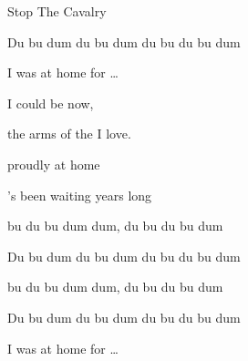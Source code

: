 \begin{SBSong}{Stop The Cavalry}
\begin{SBVerse}
    Du bu  dum du bu dum du bu du bu dum
    
     I was at home for \ldots
    
          
    
     I could be  now,
    
     the arms of the  I love.
    
     proudly  at home
    
    's been waiting  years long
  \end{SBVerse}
  \begin{SBVerse}
     bu du bu dum dum, du bu du bu dum
    
    Du bu  dum du bu dum du bu du bu dum
    
     bu du bu dum dum, du bu du bu dum
    
    Du bu  dum du bu dum du bu du bu dum
    
     I was at home for \ldots
    
         
  \end{SBVerse}
\end{SBSong}